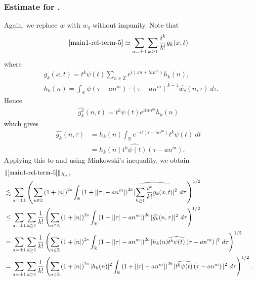 \documentclass[12pt,reqno]{amsart}
\numberwithin{equation}{section}  %
\renewcommand{\cref}{\Cref}
\newcommand{\rr}{\mathbb{R}}
\newcommand{\zz}{\mathbb{Z}}
\newcommand{\wh}{\widehat}
\begin{document}
%
%
%
\subsubsection{Estimate for \cref{main1-rel-term-5}.}
Again, we replace $w$ with $w_{\delta}$ without impunity. Note that
%
%
\begin{equation}
	\label{1n}
	\begin{split}
    \cref{main1-rel-term-5} \simeq \sum_{a = \pm 1}\sum_{k \ge 1}
		\frac{i^k}{k!}g_k(x,t)
	\end{split}
\end{equation}
%
%
where 
%
%
\begin{equation*}
	\begin{split}
		& g_k(x,t) = t^k \psi(t) \sum_{n \in \zz} e^{i\left( xn + ta n^{m}
		\right)} h_k(n),
		\\
		& h_k(n) = \int_\rr \psi \left( \tau - an^{m} \right) \cdot \left(
		\tau - an^{m} \right)^{k -1} \wh{w_{\delta}}(n, \tau) \ d \tau.
	\end{split}
\end{equation*}
%
%
Hence
%
%
\begin{equation*}
	\begin{split}
		\wh{g_k^x}(n, t) = t^{k} \psi(t) e^{i t an^{m}} h_k(n)
	\end{split}
\end{equation*}
%
%
which gives
%
%
\begin{equation*}
	\begin{split}
		\wh{g_k}(n, \tau)
		& = h_k(n) \int_\rr e^{-it\left( \tau - an^{m} \right)}
		t^{k}\psi(t) \ dt
		\\
		& = h_k(n) \wh{t^{k}\psi(t)} \left( \tau - an^{m} \right).
	\end{split}
\end{equation*}
%
%
Applying this to \cref{1n} and using Minkowski's inequality, we obtain
%
%
\begin{equation}
	\label{2n}
	\begin{split}
		& \|\cref{main1-rel-term-5}\|_{X_{s,b}} 
    \\
    & \lesssim \sum_{a = \pm 1} \left( \sum_{n \in \zz} \left (1 + |n| \right )^{2s}
    \int_\rr \left( 1 + | |\tau| - an^{m} | \right)^{2b}
    | \wh{\sum_{k \ge 1} \frac{i^k}{k!}g_k(x,t)} |^2 \ d \tau
		\right)^{1/2}
		\\
		& \le \sum_{a = \pm 1}\sum_{k \ge 1} \frac{1}{k!}\left( \sum_{n \in \zz} \left (1 + |n| \right )^{2s}
    \int_\rr \left( 1 + | |\tau| - an^{m} | \right)^{2b} | \wh{g_k}(n, \tau) |^2 \
		d \tau \right)^{1/2}
		\\
		& = \sum_{a = \pm 1}\sum_{k \ge 1} \frac{1}{k!} \left( \sum_{n \in \zz} \left (1 + |n| \right )^{2s}
    \int_\rr \left( 1 + | |\tau| - an^{m} | \right)^{2b} | h_k(n) \wh{t^k
		\psi(t)} \left( \tau - an^{m} \right) |^2 \ d \tau \right)^{1/2}
		\\
		& = \sum_{a = \pm 1}\sum_{k \ge 1} \frac{1}{k!} \left( \sum_{n \in \zz} \left (1 + |n| \right )^{2s} |
    h_k(n) |^2 \int_\rr \left( 1 + | |\tau| - an^{m} | \right)^{2b} | \wh{t^k
		\psi(t)} \left( \tau - an^{m} \right) |^2 \ d \tau \right)^{1/2}.
	\end{split}
\end{equation}
\end{document}
